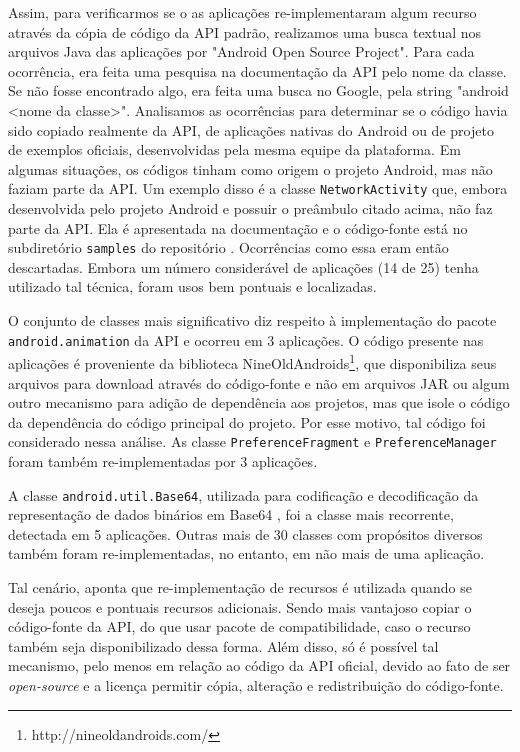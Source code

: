 Assim, para verificarmos se o as aplicações re-implementaram algum recurso através
da cópia de código da API padrão, realizamos uma busca textual nos arquivos Java
das aplicações por "Android Open Source Project". Para cada ocorrência, era feita
uma pesquisa na documentação da API pelo nome da classe. Se não fosse encontrado
algo, era feita uma busca no Google, pela string "android <nome da classe>".
Analisamos as ocorrências  para determinar se o código havia sido copiado realmente
da API, de aplicações nativas do Android ou de projeto de exemplos oficiais,
desenvolvidas pela mesma equipe da plataforma. Em algumas situações, os códigos
tinham como origem o projeto Android, mas não faziam parte da API. Um exemplo disso
é a classe \texttt{NetworkActivity} que, embora desenvolvida pelo projeto Android e
possuir o preâmbulo citado acima, não faz parte da API. Ela é apresentada na
documentação \cite{NetworkUsage} e o código-fonte está no subdiretório \texttt{samples}
do repositório \cite{NetworkActivity}. Ocorrências como essa eram então descartadas.
Embora um número considerável de aplicações (14 de 25) tenha utilizado tal técnica,
foram usos bem pontuais e localizadas.

O conjunto de classes mais significativo diz respeito à implementação do pacote 
\texttt{android.animation} da API e ocorreu em 3 aplicações. O código presente
nas aplicações é proveniente da biblioteca NineOldAndroids\footnote{http://nineoldandroids.com/},
que disponibiliza seus arquivos para
download através do código-fonte e não em arquivos JAR ou algum outro mecanismo
para adição de dependência aos projetos, mas que isole o código da dependência
do código principal do projeto. Por esse motivo, tal código foi considerado
nessa análise. As classe \texttt{PreferenceFragment} e \texttt{PreferenceManager}
foram também re-implementadas por 3 aplicações.

A classe \texttt{android.util.Base64}, utilizada para codificação e decodificação
da representação de dados binários em Base64 \cite{RFC4648}, foi a classe mais
recorrente, detectada em 5 aplicações. Outras mais de 30 classes com propósitos 
diversos também foram re-implementadas, no entanto, em não mais de uma aplicação.

Tal cenário, aponta que re-implementação de recursos é utilizada quando se deseja
poucos e pontuais recursos adicionais. Sendo mais vantajoso copiar o código-fonte
da API, do que usar pacote de compatibilidade, caso o recurso também seja
disponibilizado dessa forma. Além disso, só é possível tal mecanismo, pelo menos em
relação ao código da API oficial, devido ao fato de ser \textit{open-source} e a
licença permitir cópia, alteração e redistribuição do código-fonte.

